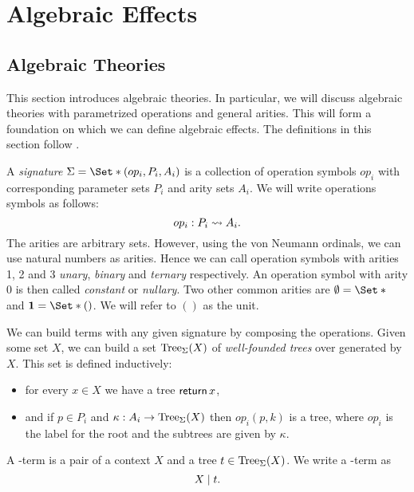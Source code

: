 \section{Algebraic Effects}\label{sec:alg}


\subsection{Algebraic Theories}

This section introduces algebraic theories. In particular, we will discuss algebraic theories with parametrized operations and general arities. This will form a foundation on which we can define algebraic effects. The definitions in this section follow \textcite{bauer_what_2018}.


\begin{definition}[Signature]
    A \emph{signature} $\Sig = \S{(op_i, P_i, A_i)}$ is a collection of operation symbols $op_i$ with corresponding parameter sets $P_i$ and arity sets $A_i$. We will write operations symbols as follows:
    \[ op_i : P_i \rightsquigarrow A_i. \]
    The arities are arbitrary sets. However, using the von Neumann ordinals, we can use natural numbers as arities. Hence we can call operation symbols with arities 1, 2 and 3 \emph{unary}, \emph{binary} and \emph{ternary} respectively. An operation symbol with arity $0$ is then called \emph{constant} or \emph{nullary}. Two other common arities are $\emptyset = \S{}$ and $\mathbf{1} = \S{()}$. We will refer to $()$ as the unit.
\end{definition}

We can build terms with any given signature by composing the operations. Given some set $X$, we can build a set $\operatorname{Tree}_\Sigma(X)$ of \emph{well-founded trees} over \Sig generated by $X$. This set is defined inductively:
\begin{itemize}
    \item for every $x\in X$ we have a tree $\operatorname{\mathsf{return}} x$,
    \item and if $p\in P_i$ and $\kappa : A_i \to \operatorname{Tree}_\Sigma(X)$ then $op_i(p,k)$ is a tree, where $op_i$ is the label for the root and the subtrees are given by $\kappa$.
\end{itemize}

A \Sig-term is a pair of a context $X$ and a tree $t \in \operatorname{Tree}_\Sigma(X)$. We write a \Sig-term as
\[ X \;|\; t. \]

